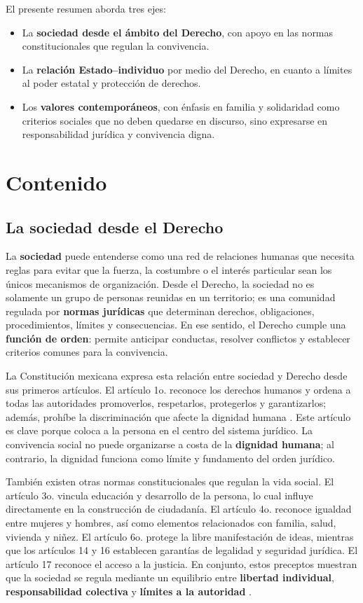 \documentclass[
	spanish,
	letterpaper, oneside
]{article}
\begin{document}
El presente resumen aborda tres ejes:

\begin{itemize}
  \item La \textbf{sociedad desde el ámbito del Derecho}, con apoyo en las normas constitucionales que regulan la convivencia.
  \item La \textbf{relación Estado--individuo} por medio del Derecho, en cuanto a límites al poder estatal y protección de derechos.
  \item Los \textbf{valores contemporáneos}, con énfasis en familia y solidaridad como criterios sociales que no deben quedarse en discurso, sino expresarse en responsabilidad jurídica y convivencia digna.
\end{itemize}

\section{Contenido}

\subsection{La sociedad desde el Derecho}

La \textbf{sociedad} puede entenderse como una red de relaciones humanas que necesita reglas para evitar que la fuerza, la costumbre o el interés particular sean los únicos mecanismos de organización. Desde el Derecho, la sociedad no es solamente un grupo de personas reunidas en un territorio; es una comunidad regulada por \textbf{normas jurídicas} que determinan derechos, obligaciones, procedimientos, límites y consecuencias. En ese sentido, el Derecho cumple una \textbf{función de orden}: permite anticipar conductas, resolver conflictos y establecer criterios comunes para la convivencia.

La Constitución mexicana expresa esta relación entre sociedad y Derecho desde sus primeros artículos. El artículo 1o. reconoce los derechos humanos y ordena a todas las autoridades promoverlos, respetarlos, protegerlos y garantizarlos; además, prohíbe la discriminación que afecte la dignidad humana \citep{constitucionCPEUM2026}. Este artículo es clave porque coloca a la persona en el centro del sistema jurídico. La convivencia social no puede organizarse a costa de la \textbf{dignidad humana}; al contrario, la dignidad funciona como límite y fundamento del orden jurídico.

También existen otras normas constitucionales que regulan la vida social. El artículo 3o. vincula educación y desarrollo de la persona, lo cual influye directamente en la construcción de ciudadanía. El artículo 4o. reconoce igualdad entre mujeres y hombres, así como elementos relacionados con familia, salud, vivienda y niñez. El artículo 6o. protege la libre manifestación de ideas, mientras que los artículos 14 y 16 establecen garantías de legalidad y seguridad jurídica. El artículo 17 reconoce el acceso a la justicia. En conjunto, estos preceptos muestran que la sociedad se regula mediante un equilibrio entre \textbf{libertad individual}, \textbf{responsabilidad colectiva} y \textbf{límites a la autoridad} \citep{constitucionCPEUM2026}.
\end{document}

